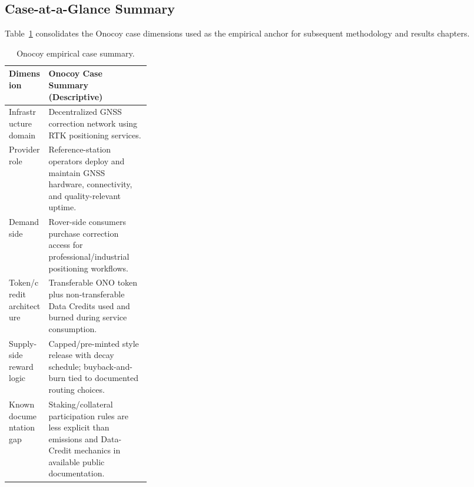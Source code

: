 \subsection{Case-at-a-Glance Summary}
Table~\ref{tab:onocoy_case_at_a_glance} consolidates the Onocoy case dimensions used as the empirical anchor for subsequent methodology and results chapters.
\begin{table}[ht]
    \centering
    \small
    \renewcommand{\arraystretch}{1.2}
    \begin{tabularx}{\textwidth}{@{}p{0.28\linewidth}X@{}}
        \toprule
        \textbf{Dimension} & \textbf{Onocoy Case Summary (Descriptive)} \\
        \midrule
        Infrastructure domain & Decentralized GNSS correction network using RTK positioning services. \\
        Provider role & Reference-station operators deploy and maintain GNSS hardware, connectivity, and quality-relevant uptime. \\
        Demand side & Rover-side consumers purchase correction access for professional/industrial positioning workflows. \\
        Token/credit architecture & Transferable ONO token plus non-transferable Data Credits used and burned during service consumption. \\
        Supply-side reward logic & Capped/pre-minted style release with decay schedule; buyback-and-burn tied to documented routing choices. \\
        Known documentation gap & Staking/collateral participation rules are less explicit than emissions and Data-Credit mechanics in available public documentation. \\
        \bottomrule
    \end{tabularx}
    \caption{Onocoy empirical case summary.}
    \label{tab:onocoy_case_at_a_glance}
\end{table}

\ifincludeprovenance

\fi
